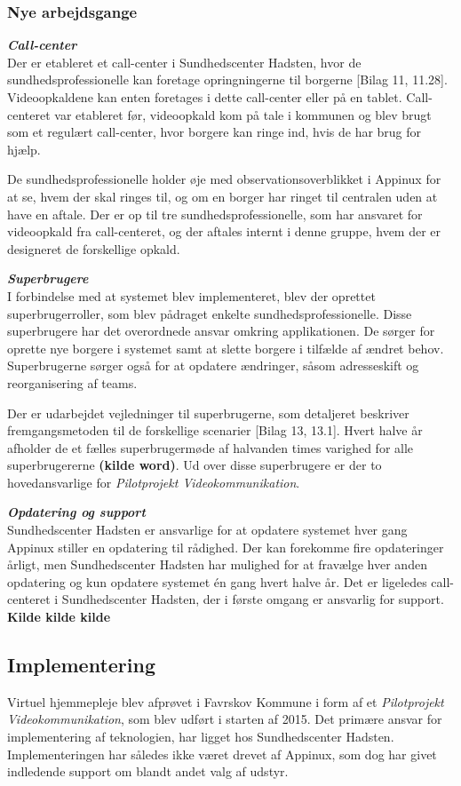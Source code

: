 \subsubsection{Nye arbejdsgange}
\textit{\textbf{Call-center}}\\
Der er etableret et call-center i Sundhedscenter Hadsten, hvor de sundhedsprofessionelle kan foretage opringningerne til borgerne [Bilag 11, 11.28]. Videoopkaldene kan enten foretages i dette call-center eller på en tablet. Call-centeret var etableret før, videoopkald kom på tale i kommunen og blev brugt som et regulært call-center, hvor borgere kan ringe ind, hvis de har brug for hjælp.

De sundhedsprofessionelle holder øje med observationsoverblikket i Appinux for at se, hvem der skal ringes til, og om en borger har ringet til centralen uden at have en aftale. Der er op til tre sundhedsprofessionelle, som har ansvaret for videoopkald fra call-centeret, og der aftales internt i denne gruppe, hvem der er designeret de forskellige opkald.

\textit{\textbf{Superbrugere}}\\
I forbindelse med at systemet blev implementeret, blev der oprettet superbrugerroller, som blev pådraget enkelte sundhedsprofessionelle. Disse superbrugere har det overordnede ansvar omkring applikationen. De sørger for oprette nye borgere i systemet samt at slette borgere i tilfælde af ændret behov. Superbrugerne sørger også for at opdatere ændringer, såsom adresseskift og reorganisering af teams.

Der er udarbejdet vejledninger til superbrugerne, som detaljeret beskriver fremgangsmetoden til de forskellige scenarier [Bilag 13, 13.1]. Hvert halve år afholder de et fælles superbrugermøde af halvanden times varighed for alle superbrugererne \textbf{(kilde word)}. Ud over disse superbrugere er der to hovedansvarlige for \textit{Pilotprojekt Videokommunikation}.

\textit{\textbf{Opdatering og support}}\\
Sundhedscenter Hadsten er ansvarlige for at opdatere systemet hver gang Appinux stiller en opdatering til rådighed. Der kan forekomme fire opdateringer årligt, men Sundhedscenter Hadsten har mulighed for at fravælge hver anden opdatering og kun opdatere systemet én gang hvert halve år.
Det er ligeledes call-centeret i Sundhedscenter Hadsten, der i første omgang er ansvarlig for support. \textbf{Kilde kilde kilde}

\subsection{Implementering}
Virtuel hjemmepleje blev afprøvet i Favrskov Kommune i form af et \textit{Pilotprojekt Videokommunikation}, som blev udført i starten af 2015. Det primære ansvar for implementering af teknologien, har ligget hos Sundhedscenter Hadsten. Implementeringen har således ikke været drevet af Appinux, som dog har givet indledende support om blandt andet valg af udstyr.

